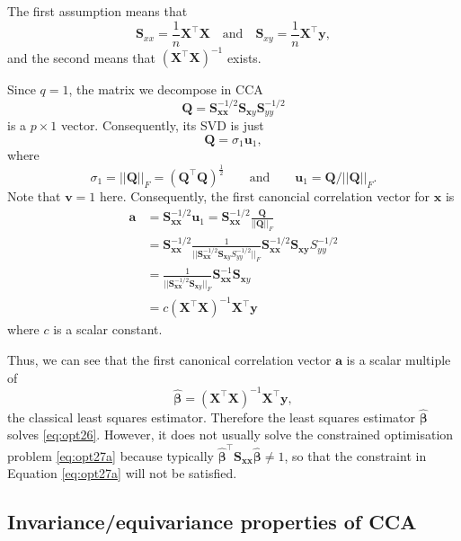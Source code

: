 \documentclass[
]{book}
\theoremstyle{definition}
\theoremstyle{definition}
\theoremstyle{definition}
\theoremstyle{definition}
\theoremstyle{remark}
\begin{document}
The first assumption means that
\[\mathbf S_{xx}=\frac{1}{n}\mathbf X^\top \mathbf X\quad \mbox{and}\quad \mathbf S_{xy}=\frac{1}{n}\mathbf X^\top \mathbf y,\] and the second means that \((\mathbf X^\top \mathbf X)^{-1}\) exists.

Since \(q=1\), the matrix we decompose in CCA
\[
\mathbf Q=\mathbf S_{\mathbf x\mathbf x}^{-1/2} \mathbf S_{\mathbf xy}\mathbf S_{yy}^{-1/2}
\]
is a \(p \times 1\) vector. Consequently, its
SVD is just
\[
\mathbf Q=\sigma_1 \mathbf u_1,
\]
where
\[
\sigma_1=\vert \vert \mathbf Q\vert \vert_F = (\mathbf Q^\top \mathbf Q)^{\frac{1}{2}} \qquad \text{and} \qquad \mathbf u_1=\mathbf Q/\vert \vert \mathbf Q\vert \vert_F.
\]
Note that \(\mathbf v=1\) here.
Consequently, the first canoncial correlation vector for \(\mathbf x\) is
\begin{align*}
\mathbf a&=\mathbf S_{\mathbf x\mathbf x}^{-1/2}\mathbf u_1 =\mathbf S_{\mathbf x\mathbf x}^{-1/2} \frac{\mathbf Q}{||\mathbf Q||_F}\\
&=\mathbf S_{\mathbf x\mathbf x}^{-1/2} \frac{1}{\vert \vert \mathbf S_{\mathbf x\mathbf x}^{-1/2}\mathbf S_{\mathbf xy}S_{yy}^{-1/2}\vert \vert_F}\mathbf S_{\mathbf x\mathbf x}^{-1/2}\mathbf S_{\mathbf x\mathbf y}S_{yy}^{-1/2}\\
&=\frac{1}{\vert \vert \mathbf S_{\mathbf x\mathbf x}^{-1/2}\mathbf S_{\mathbf xy}\vert \vert_F}\mathbf S_{\mathbf x\mathbf x}^{-1}\mathbf S_{\mathbf xy}\\
&= c (\mathbf X^\top \mathbf X)^{-1}\mathbf X^\top \mathbf y
\end{align*}
where \(c\) is a scalar constant.

Thus, we can see that the first canonical correlation vector \(\mathbf a\) is a scalar multiple of
\[
\hat{\pmb \beta}=\left ( \mathbf X^\top \mathbf X\right )^{-1} \mathbf X^\top \mathbf y,
\]
the classical least squares estimator. Therefore the least squares estimator \(\hat{\pmb \beta}\) solves \eqref{eq:opt26}. However, it does not usually solve the constrained optimisation problem \eqref{eq:opt27a} because typically \(\hat{\pmb \beta}^\top \mathbf S_{\mathbf x\mathbf x}\hat{\pmb \beta} \not= 1\), so that the constraint in Equation \eqref{eq:opt27a} will not be satisfied.

\hypertarget{invarianceequivariance-properties-of-cca}{%
\subsection{Invariance/equivariance properties of CCA}\label{invarianceequivariance-properties-of-cca}}
\end{document}
